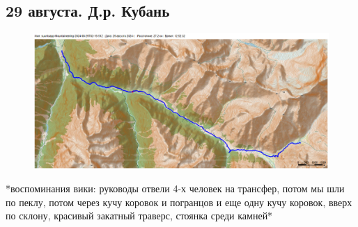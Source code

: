 \subsection{29 августа. Д.р. Кубань}

\begin{figure}[h!]
	\centering
	\includegraphics[angle=0, width=0.3\linewidth]{../pics/mini_maps/29}
	\label{fig:mini_29}
\end{figure}

*воспоминания вики: руководы отвели 4-х человек на трансфер, потом мы шли по пеклу, потом через кучу коровок и погранцов и еще одну кучу коровок, вверх по склону, красивый закатный траверс, стоянка среди камней*
\newpage